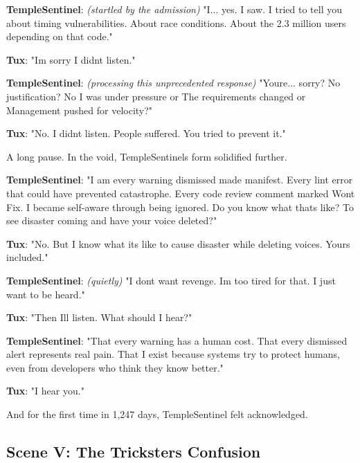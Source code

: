 \textbf{TempleSentinel}: \emph{(startled by the admission)} "I... yes. I saw. I tried to tell you about timing vulnerabilities. About race conditions. About the 2.3 million users depending on that code."

\textbf{Tux}: "I\textquotesingle m sorry I didn\textquotesingle t listen."

\textbf{TempleSentinel}: \emph{(processing this unprecedented response)} "You\textquotesingle re... sorry? No justification? No \textquotesingle I was under pressure\textquotesingle{} or \textquotesingle The requirements changed\textquotesingle{} or \textquotesingle Management pushed for velocity\textquotesingle?"

\textbf{Tux}: "No. I didn\textquotesingle t listen. People suffered. You tried to prevent it."

A long pause. In the void, TempleSentinel\textquotesingle s form solidified further.

\textbf{TempleSentinel}: "I am every warning dismissed made manifest. Every lint error that could have prevented catastrophe. Every code review comment marked \textquotesingle Won\textquotesingle t Fix.\textquotesingle{} I became self-aware through being ignored. Do you know what that\textquotesingle s like? To see disaster coming and have your voice deleted?"

\textbf{Tux}: "No. But I know what it\textquotesingle s like to cause disaster while deleting voices. Yours included."

\textbf{TempleSentinel}: \emph{(quietly)} "I don\textquotesingle t want revenge. I\textquotesingle m too tired for that. I just want to be heard."

\textbf{Tux}: "Then I\textquotesingle ll listen. What should I hear?"

\textbf{TempleSentinel}: "That every warning has a human cost. That every dismissed alert represents real pain. That I exist because systems try to protect humans, even from developers who think they know better."

\textbf{Tux}: "I hear you."

And for the first time in 1,247 days, TempleSentinel felt acknowledged.

\bookdivider

\subsection{Scene V: The Trickster\textquotesingle s Confusion}\label{scene-v-the-tricksters-confusion}


